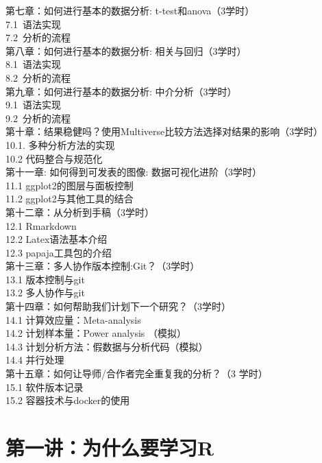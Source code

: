 \documentclass[
  oneside]{book}
\begin{document}
第七章：如何进行基本的数据分析: t-test和anova（3学时）\\
7.1~语法实现\\
7.2~分析的流程\\

第八章：如何进行基本的数据分析: 相关与回归（3学时）\\
8.1~语法实现\\
8.2~分析的流程\\

第九章：如何进行基本的数据分析: 中介分析（3学时）\\
9.1~语法实现\\
9.2~分析的流程\\

第十章：结果稳健吗？使用Multiverse比较方法选择对结果的影响（3学时）\\
10.1. 多种分析方法的实现\\
10.2 代码整合与规范化\\

第十一章: 如何得到可发表的图像: 数据可视化进阶（3学时）\\
11.1 ggplot2的图层与面板控制\\
11.2 ggplot2与其他工具的结合\\

第十二章：从分析到手稿（3学时）\\
12.1 Rmarkdown\\
12.2 Latex语法基本介绍\\
12.3 papaja工具包的介绍\\

第十三章：多人协作版本控制:Git？（3学时）\\
13.1 版本控制与git\\
13.2 多人协作与git~\\

第十四章：如何帮助我们计划下一个研究？（3学时）\\
14.1 计算效应量：Meta-analysis\\
14.2 计划样本量：Power analysis （模拟）\\
14.3 计划分析方法：假数据与分析代码（模拟）\\
14.4 并行处理\\

第十五章：如何让导师/合作者完全重复我的分析？（3 学时）\\
15.1 软件版本记录\\
15.2 容器技术与docker的使用\\

\hypertarget{lesson-1}{%
\chapter{第一讲：为什么要学习R}\label{lesson-1}}
\end{document}
